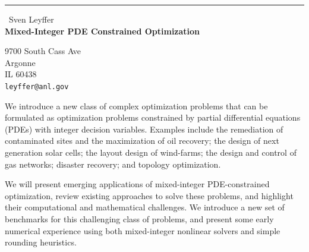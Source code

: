 \documentclass{report}
\begin{document}
\begin{center}
\rule{6in}{1pt} \
{\large Sven Leyffer \\
{\bf Mixed-Integer PDE Constrained Optimization}}

9700 South Cass Ave \\ Argonne \\ IL 60438
\\
{\tt leyffer@anl.gov}\end{center}

We introduce a new class of complex optimization problems that can be
formulated as optimization problems constrained by partial differential
equations (PDEs) with integer decision variables. Examples include the
remediation of contaminated sites and the maximization of oil recovery;
the design of next generation solar cells; the layout design of
wind-farms; the design and control of gas networks; disaster recovery;
and topology optimization.

We will present emerging applications of mixed-integer PDE-constrained
optimization, review existing approaches to solve these problems, and
highlight their computational and mathematical challenges. We introduce a
new set of benchmarks for this challenging class of problems, and present
some early numerical experience using both mixed-integer nonlinear
solvers and simple rounding heuristics.
\end{document}
